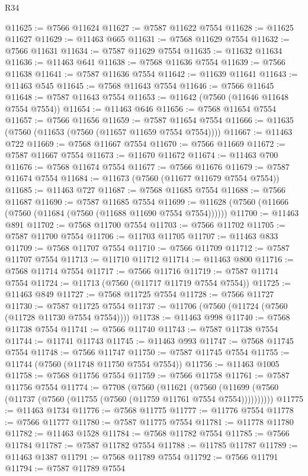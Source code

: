 \begin{lexlean}{R34}
\begin{coremodule}
@11625 := @7566 @11624
@11627 := @7587 @11622 @7554
@11628 := @11625 @11627
@11629 := @11463 @665
@11631 := @7568 @11629 @7554
@11632 := @7566 @11631
@11634 := @7587 @11629 @7554
@11635 := @11632 @11634
@11636 := @11463 @641
@11638 := @7568 @11636 @7554
@11639 := @7566 @11638
@11641 := @7587 @11636 @7554
@11642 := @11639 @11641
@11643 := @11463 @545
@11645 := @7568 @11643 @7554
@11646 := @7566 @11645
@11648 := @7587 @11643 @7554
@11653 := @11642 (@7560 (@11646 @11648 @7554 @7554))
@11654 := @11463 @646
@11656 := @7568 @11654 @7554
@11657 := @7566 @11656
@11659 := @7587 @11654 @7554
@11666 := @11635 (@7560 (@11653 (@7560 (@11657 @11659 @7554 @7554))))
@11667 := @11463 @722
@11669 := @7568 @11667 @7554
@11670 := @7566 @11669
@11672 := @7587 @11667 @7554
@11673 := @11670 @11672
@11674 := @11463 @700
@11676 := @7568 @11674 @7554
@11677 := @7566 @11676
@11679 := @7587 @11674 @7554
@11684 := @11673 (@7560 (@11677 @11679 @7554 @7554))
@11685 := @11463 @727
@11687 := @7568 @11685 @7554
@11688 := @7566 @11687
@11690 := @7587 @11685 @7554
@11699 := @11628 (@7560 (@11666 (@7560 (@11684 (@7560 (@11688 @11690 @7554 @7554))))))
@11700 := @11463 @891
@11702 := @7568 @11700 @7554
@11703 := @7566 @11702
@11705 := @7587 @11700 @7554
@11706 := @11703 @11705
@11707 := @11463 @833
@11709 := @7568 @11707 @7554
@11710 := @7566 @11709
@11712 := @7587 @11707 @7554
@11713 := @11710 @11712
@11714 := @11463 @800
@11716 := @7568 @11714 @7554
@11717 := @7566 @11716
@11719 := @7587 @11714 @7554
@11724 := @11713 (@7560 (@11717 @11719 @7554 @7554))
@11725 := @11463 @849
@11727 := @7568 @11725 @7554
@11728 := @7566 @11727
@11730 := @7587 @11725 @7554
@11737 := @11706 (@7560 (@11724 (@7560 (@11728 @11730 @7554 @7554))))
@11738 := @11463 @998
@11740 := @7568 @11738 @7554
@11741 := @7566 @11740
@11743 := @7587 @11738 @7554
@11744 := @11741 @11743
@11745 := @11463 @993
@11747 := @7568 @11745 @7554
@11748 := @7566 @11747
@11750 := @7587 @11745 @7554
@11755 := @11744 (@7560 (@11748 @11750 @7554 @7554))
@11756 := @11463 @1005
@11758 := @7568 @11756 @7554
@11759 := @7566 @11758
@11761 := @7587 @11756 @7554
@11774 := @7708
    (@7560
      (@11621
        (@7560 (@11699 (@7560 (@11737 (@7560 (@11755 (@7560 (@11759 @11761 @7554 @7554))))))))))
@11775 := @11463 @1734
@11776 := @7568 @11775
@11777 := @11776 @7554
@11778 := @7566 @11777
@11780 := @7587 @11775 @7554
@11781 := @11778 @11780
@11782 := @11463 @1528
@11784 := @7568 @11782 @7554
@11785 := @7566 @11784
@11787 := @7587 @11782 @7554
@11788 := @11785 @11787
@11789 := @11463 @1387
@11791 := @7568 @11789 @7554
@11792 := @7566 @11791
@11794 := @7587 @11789 @7554

\end{coremodule}
\end{lexlean}
